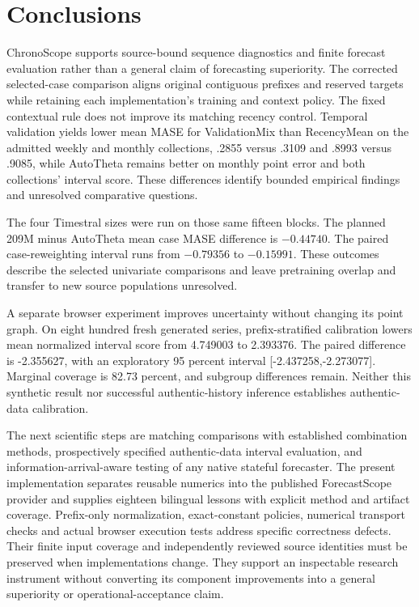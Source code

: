 \section{Conclusions}
ChronoScope supports source-bound sequence diagnostics and finite forecast evaluation rather than a general claim of forecasting superiority. The corrected selected-case comparison aligns original contiguous prefixes and reserved targets while retaining each implementation's training and context policy. The fixed contextual rule does not improve its matching recency control. Temporal validation yields lower mean MASE for ValidationMix than RecencyMean on the admitted weekly and monthly collections, .2855 versus .3109 and .8993 versus .9085, while AutoTheta remains better on monthly point error and both collections' interval score. These differences identify bounded empirical findings and unresolved comparative questions.

The four Timestral sizes were run on those same fifteen blocks. The planned
209M minus AutoTheta mean case MASE difference is $-0.44740$. The paired
case-reweighting interval runs from $-0.79356$ to $-0.15991$. These outcomes
describe the selected univariate comparisons and leave pretraining overlap
and transfer to new source populations unresolved.

A separate browser experiment improves uncertainty without changing its point graph. On eight hundred fresh generated series, prefix-stratified calibration lowers mean normalized interval score from 4.749003 to 2.393376. The paired difference is -2.355627, with an exploratory 95 percent interval [-2.437258,-2.273077]. Marginal coverage is 82.73 percent, and subgroup differences remain. Neither this synthetic result nor successful authentic-history inference establishes authentic-data calibration.

The next scientific steps are matching comparisons with established combination methods, prospectively specified authentic-data interval evaluation, and information-arrival-aware testing of any native stateful forecaster. The present implementation separates reusable numerics into the published ForecastScope provider and supplies eighteen bilingual lessons with explicit method and artifact coverage. Prefix-only normalization, exact-constant policies, numerical transport checks and actual browser execution tests address specific correctness defects. Their finite input coverage and independently reviewed source identities must be preserved when implementations change. They support an inspectable research instrument without converting its component improvements into a general superiority or operational-acceptance claim.
